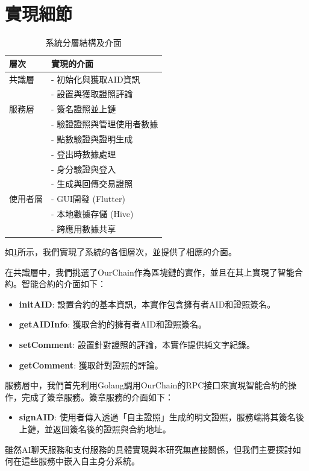 \section{實現細節}
\begin{table}[htbp]
  \centering
  \caption{系統分層結構及介面}
  \label{tab:system-interfaces}
  \begin{tabularx}{\textwidth}{|l|X|}
    \hline
    \textbf{層次} & \textbf{實現的介面}    \\
    \hline
    共識層         & - 初始化與獲取AID資訊     \\
                & - 設置與獲取證照評論       \\
    \hline
    服務層         & - 簽名證照並上鏈         \\
                & - 驗證證照與管理使用者數據     \\
                & - 點數驗證與證明生成       \\
                & - 登出時數據處理         \\
                & - 身分驗證與登入         \\
                & - 生成與回傳交易證照       \\
    \hline
    使用者層         & - GUI開發 (Flutter) \\
                & - 本地數據存儲 (Hive)   \\
                & - 跨應用數據共享         \\
    \hline
  \end{tabularx}
\end{table}
如\ref{tab:system-interfaces}所示，我們實現了系統的各個層次，並提供了相應的介面。

在共識層中，我們挑選了OurChain\cite{ourlab408_ourchain}作為區塊鏈的實作，並且在其上實現了智能合約。智能合約的介面如下：
\begin{itemize}
  \item \textbf{initAID}: 設置合約的基本資訊，本實作包含擁有者AID和證照簽名。
  \item \textbf{getAIDInfo}: 獲取合約的擁有者AID和證照簽名。
  \item \textbf{setComment}: 設置針對證照的評論，本實作提供純文字紀錄。
  \item \textbf{getComment}: 獲取針對證照的評論。
\end{itemize}
服務層中，我們首先利用Golang調用OurChain的RPC接口來實現智能合約的操作，完成了簽章服務。簽章服務的介面如下：
\begin{itemize}
  \item \textbf{signAID}: 使用者傳入透過「自主證照」生成的明文證照，服務端將其簽名後上鏈，並返回簽名後的證照與合約地址。
\end{itemize}
雖然AI聊天服務和支付服務的具體實現與本研究無直接關係，但我們主要探討如何在這些服務中嵌入自主身分系統。

